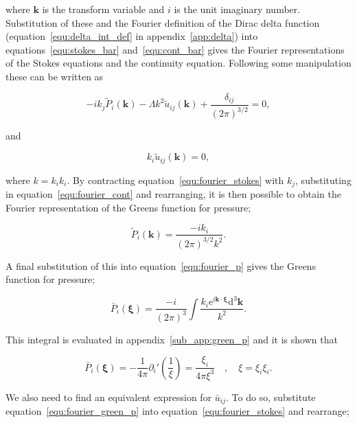 \documentclass[12pt]{article}
\begin{document}
where $\boldsymbol{k}$ is the transform variable and $i$ is the unit imaginary number. Substitution of these and the Fourier definition of the Dirac delta function (equation~\ref{equ:delta_int_def} in appendix~\ref{app:delta}) into equations~\ref{equ:stokes_bar} and~\ref{equ:cont_bar} gives the Fourier representations of the Stokes equations and the continuity equation. Following some manipulation these can be written as

\begin{equation}
\label{equ:fourier_stokes}
-i k_{j} \tilde{P}_{i} (\boldsymbol{k}) - \Lambda k^{2} \tilde{u}_{ij} (\boldsymbol{k}) + \frac{\delta_{ij}}{(2 \pi)^{3/2}} = 0 ,
\end{equation}

and 

\begin{equation}
\label{equ:fourier_cont}
k_{i} \tilde{u}_{ij} (\boldsymbol{k}) = 0 ,
\end{equation}

where $k = k_{i} k_{i}$. By contracting equation~\ref{equ:fourier_stokes} with $k_{j}$, substituting in equation~\ref{equ:fourier_cont} and rearranging, it is then possible to obtain the Fourier representation of the Greens function for pressure;

\begin{equation}
\label{equ:fourier_green_p}
\tilde{P}_{i} (\boldsymbol{k}) = \frac{-i k_{i}}{(2 \pi)^{3/2} k^{2}}.
\end{equation}

A final substitution of this into equation~\ref{equ:fourier_p} gives the Greens function for pressure;

\begin{equation}
\label{equ:green_p_int}
\bar{P}_{i} (\boldsymbol\xi) = \frac{-i}{(2 \pi)^{3}} \int \frac{k_{i} \mathrm{e}^{i \boldsymbol{k} \cdot \boldsymbol{\xi}} \mathrm{d}^{3} \boldsymbol{k}}{k^{2}} .
\end{equation}

This integral is evaluated in appendix~\ref{sub_app:green_p} and it is shown that

\begin{equation}
\label{equ:green_p}
\bar{P}_{i} (\boldsymbol\xi) = -\frac{1}{4 \pi} \partial_{i}' \left(\frac{1}{\xi}\right) = \frac{\xi_{i}}{4 \pi \xi^{3}} \quad , \quad \xi = \xi_{i} \xi_{i} .
\end{equation}

We also need to find an equivalent expression for $\bar{u}_{ij}$. To do so, substitute equation~\ref{equ:fourier_green_p} into equation~\ref{equ:fourier_stokes} and rearrange;
\end{document}
